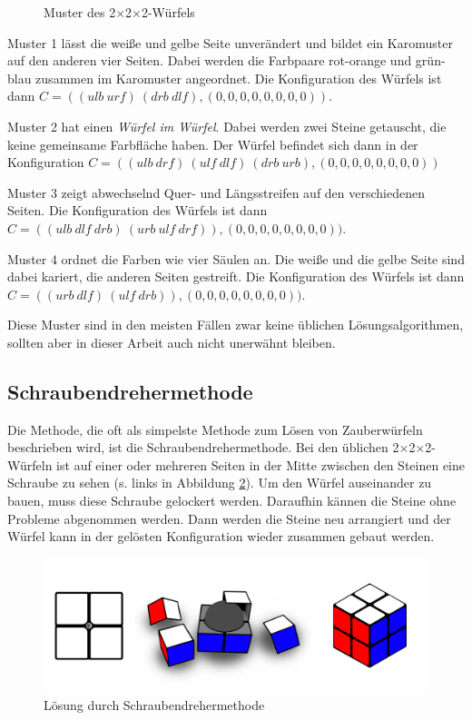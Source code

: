\documentclass[12pt,a4paper, usenames, dvipsnames]{article}
\theoremstyle{mystyle}
\theoremstyle{definition}
\newcommand{\Ttwo}{2$\times$2$\times$2-}
\begin{document}
\begin{figure}[h]
\caption{Muster des \Ttwo Würfels}
\label{Abbildung_Muster}
\end{figure}

Muster 1 lässt die weiße und gelbe Seite unverändert und bildet ein Karomuster auf den anderen vier Seiten. Dabei werden die Farbpaare rot-orange und grün-blau zusammen im  Karomuster angeordnet. Die Konfiguration des Würfels ist dann $C = ((\textit{ulb} \ \textit{urf} ) \ ( \textit{drb} \ \textit{dlf} ),(0,0,0,0,0,0,0,0))$.

Muster 2 hat einen \textit{Würfel im Würfel}. Dabei werden zwei Steine getauscht, die keine gemeinsame Farbfläche haben. Der Würfel befindet sich dann in der Konfiguration $C = (( ulb \ drf ) \ ( ulf \ dlf ) \ ( drb \ urb ),(0,0,0,0,0,0,0,0))$

Muster 3 zeigt abwechselnd Quer- und Längsstreifen auf den verschiedenen Seiten. Die Konfiguration des Würfels ist dann $C = (( \textit{ulb} \ \textit{dlf} \ \textit{drb} ) \ ( \textit{urb} \ \textit{ulf} \ \textit{drf} )),(0,0,0,0,0,0,0,0))$.

Muster 4 ordnet die Farben wie vier Säulen an. Die weiße und die gelbe Seite sind dabei kariert, die anderen Seiten gestreift. Die Konfiguration des Würfels ist dann $C = ( (\textit{urb} \ \textit{dlf} ) \ ( \textit{ulf} \ \textit{drb}  ) ),(0,0,0,0,0,0,0,0))$.


Diese Muster sind in den meisten Fällen zwar keine üblichen Lösungsalgorithmen, sollten aber in dieser Arbeit auch nicht unerwähnt bleiben.

%
%
%
%
%
%
%
%
%
%
%
%
%
%
%
%
%
%
%
\subsection{Schraubendrehermethode}

Die Methode, die oft als simpelste Methode zum Lösen von Zauberwürfeln beschrieben wird, ist die Schraubendrehermethode.
Bei den üblichen \Ttwo Würfeln ist auf einer oder mehreren Seiten in der Mitte zwischen den Steinen eine Schraube zu sehen (s. links in Abbildung \ref{Abbildung_Schraubendrehermethode}).
Um den Würfel auseinander zu bauen, muss diese Schraube gelockert werden. Daraufhin kännen die Steine ohne Probleme abgenommen werden. 
Dann werden die Steine neu arrangiert und der Würfel kann in der gelösten Konfiguration wieder zusammen gebaut werden.

\begin{figure}[H]
\centering
\includegraphics[scale=0.2]{schraube_m.png}
\caption{Lösung durch Schraubendrehermethode}
\label{Abbildung_Schraubendrehermethode}
\end{figure}
\end{document}
